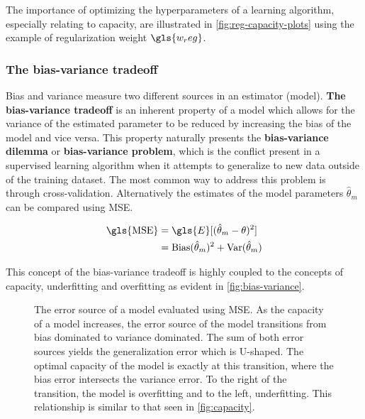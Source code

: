 The importance of optimizing the hyperparameters of a learning algorithm,
especially relating to capacity, are illustrated in
\autoref{fig:reg-capacity-plots} using the example of regularization weight
$\gls{w_reg}$.

\subsubsection{The bias-variance tradeoff}
Bias and variance measure two different sources in an estimator (model).
\textbf{The bias-variance tradeoff} is an inherent property of a model which
allows for the variance of the estimated parameter to be reduced by increasing
the bias of the model and vice versa. This property naturally presents the
\textbf{bias-variance dilemma} or \textbf{bias-variance problem}, which is the
conflict present in a supervised learning algorithm when it attempts to
generalize to new data outside of the training dataset. The most common way to
address this problem is through cross-validation. Alternatively the estimates
of the model parameters $\hat{\theta}_m$ can be compared using \gls{MSE}.

\begin{equation}
    \begin{aligned}
        \text{\gls{MSE}}&=\gls{E}[(\hat{\theta}_m-\theta)^2]\\
        &=\text{Bias}(\hat{\theta}_m)^2+\text{Var}(\hat{\theta}_m)
    \end{aligned}
\end{equation}

This concept of the bias-variance tradeoff is highly coupled to the concepts of
capacity, underfitting and overfitting as evident in
\autoref{fig:bias-variance}.

\begin{figure}[htp!]
    \centering
    
    \captionsetup{format=hang} %
    \caption{
        The error source of a model evaluated using \gls{MSE}. As the capacity of
        a model increases, the error source of the model transitions from bias
        dominated to variance dominated. The sum of both error sources yields
        the generalization error which is U-shaped. The optimal capacity of the
        model is exactly at this transition, where the bias error intersects the
        variance error. To the right of the transition, the model is overfitting
        and to the left, underfitting. This relationship is similar to that seen
        in \autoref{fig:capacity}.
    }
    \label{fig:bias-variance}
\end{figure}

